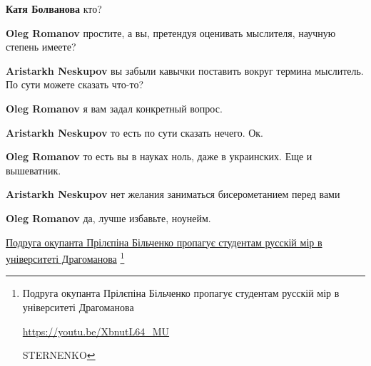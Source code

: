 \begin{itemize}
\begin{itemize}

\textbf{Катя Болванова} кто?


\textbf{Oleg Romanov} простите, а вы, претендуя оценивать мыслителя, научную степень имеете?


\textbf{Aristarkh Neskupov} вы забыли кавычки поставить вокруг термина мыслитель.
По сути можете сказать что-то?


\textbf{Oleg Romanov} я вам задал конкретный вопрос.


\textbf{Aristarkh Neskupov} то есть по сути сказать нечего.
Ок.


\textbf{Oleg Romanov} то есть вы в науках ноль, даже в украинских. Еще и вышеватник.


\textbf{Aristarkh Neskupov} нет желания заниматься бисерометанием перед вами


\textbf{Oleg Romanov} да, лучше избавьте, ноунейм.

\end{itemize}


\href{https://youtu.be/XbnutL64_MU}{Подруга окупанта Прілєпіна Більченко пропагує студентам русскій мір в університеті Драгоманова}
\footnote{
Подруга окупанта Прілєпіна Більченко пропагує студентам русскій мір в університеті Драгоманова\par
\url{https://youtu.be/XbnutL64_MU}\par
STERNENKO

}
\end{itemize}
